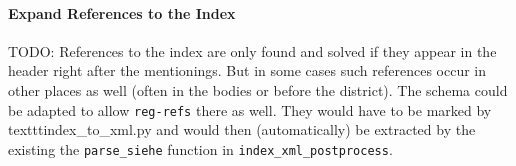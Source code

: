 \paragraph{Expand References to the Index}
TODO: References to the index are only found and solved if they appear in the header right after the mentionings. But in some cases such references occur in other places as well (often in the bodies or before the district). The schema could be adapted to allow \texttt{reg-refs} there as well. They would have to be marked by texttt{index\_to\_xml.py} and would then (automatically) be extracted by the existing the \texttt{parse\_siehe} function in \texttt{index\_xml\_postprocess}.